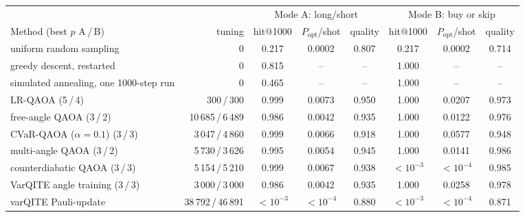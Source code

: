 \begin{tabular}{@{}lrcccccc@{}}\toprule
 & & \multicolumn{3}{c}{Mode A: long/short} & \multicolumn{3}{c}{Mode B: buy or skip}\\
\cmidrule(lr){3-5}\cmidrule(lr){6-8}
Method (best $p$ A\,/\,B) & tuning & hit@1000 & $P_{\mathrm{opt}}$/shot & quality & hit@1000 & $P_{\mathrm{opt}}$/shot & quality\\\midrule
uniform random sampling & 0 & 0.217 & 0.0002 & 0.807 & 0.217 & 0.0002 & 0.714\\
greedy descent, restarted & 0 & 0.815 & -- & -- & 1.000 & -- & --\\
simulated annealing, one 1000-step run & 0 & 0.465 & -- & -- & 1.000 & -- & --\\\midrule
LR-QAOA (5\,/\,4) & 300\,/\,300 & 0.999 & 0.0073 & 0.950 & 1.000 & 0.0207 & 0.973\\
free-angle QAOA (3\,/\,2) & 10\,685\,/\,6\,489 & 0.986 & 0.0042 & 0.935 & 1.000 & 0.0122 & 0.976\\
CVaR-QAOA ($\alpha{=}0.1$) (3\,/\,3) & 3\,047\,/\,4\,860 & 0.999 & 0.0066 & 0.918 & 1.000 & 0.0577 & 0.948\\
multi-angle QAOA (3\,/\,2) & 5\,730\,/\,3\,626 & 0.995 & 0.0054 & 0.945 & 1.000 & 0.0141 & 0.986\\
counterdiabatic QAOA (3\,/\,3) & 5\,154\,/\,5\,210 & 0.999 & 0.0067 & 0.938 & ${<}10^{-3}$ & ${<}10^{-4}$ & 0.985\\
VarQITE angle training (3\,/\,3) & 3\,000\,/\,3\,000 & 0.986 & 0.0042 & 0.935 & 1.000 & 0.0258 & 0.978\\
varQITE Pauli-update~\cite{varqite} & 38\,792\,/\,46\,891 & ${<}10^{-3}$ & ${<}10^{-4}$ & 0.880 & ${<}10^{-3}$ & ${<}10^{-4}$ & 0.871\\
\bottomrule\end{tabular}
